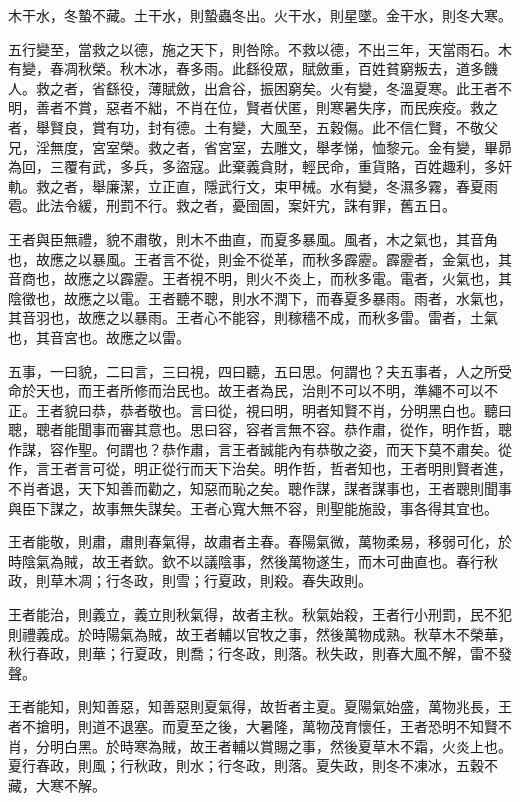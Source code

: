 木干水，冬蟄不藏。土干水，則蟄蟲冬出。火干水，則星墜。金干水，則冬大寒。

五行變至，當救之以德，施之天下，則咎除。不救以德，不出三年，天當雨石。木有變，春凋秋榮。秋木冰，春多雨。此繇役眾，賦斂重，百姓貧窮叛去，道多饑人。救之者，省繇役，薄賦斂，出倉谷，振困窮矣。火有變，冬溫夏寒。此王者不明，善者不賞，惡者不絀，不肖在位，賢者伏匿，則寒暑失序，而民疾疫。救之者，舉賢良，賞有功，封有德。土有變，大風至，五穀傷。此不信仁賢，不敬父兄，淫無度，宮室榮。救之者，省宮室，去雕文，舉孝悌，恤黎元。金有變，畢昴為回，三覆有武，多兵，多盜寇。此棄義貪財，輕民命，重貨賂，百姓趣利，多奸軌。救之者，舉廉潔，立正直，隱武行文，束甲械。水有變，冬濕多霧，春夏雨雹。此法令緩，刑罰不行。救之者，憂囹圄，案奸宄，誅有罪，舊五日。


王者與臣無禮，貌不肅敬，則木不曲直，而夏多暴風。風者，木之氣也，其音角也，故應之以暴風。王者言不從，則金不從革，而秋多霹靂。霹靂者，金氣也，其音商也，故應之以霹靂。王者視不明，則火不炎上，而秋多電。電者，火氣也，其陰徵也，故應之以電。王者聽不聰，則水不潤下，而春夏多暴雨。雨者，水氣也，其音羽也，故應之以暴雨。王者心不能容，則稼穡不成，而秋多雷。雷者，土氣也，其音宮也。故應之以雷。


五事，一曰貌，二曰言，三曰視，四曰聽，五曰思。何謂也？夫五事者，人之所受命於天也，而王者所修而治民也。故王者為民，治則不可以不明，準繩不可以不正。王者貌曰恭，恭者敬也。言曰從，視曰明，明者知賢不肖，分明黑白也。聽曰聰，聰者能聞事而審其意也。思曰容，容者言無不容。恭作肅，從作，明作哲，聰作謀，容作聖。何謂也？恭作肅，言王者誠能內有恭敬之姿，而天下莫不肅矣。從作，言王者言可從，明正從行而天下治矣。明作哲，哲者知也，王者明則賢者進，不肖者退，天下知善而勸之，知惡而恥之矣。聰作謀，謀者謀事也，王者聰則聞事與臣下謀之，故事無失謀矣。王者心寬大無不容，則聖能施設，事各得其宜也。


王者能敬，則肅，肅則春氣得，故肅者主春。春陽氣微，萬物柔易，移弱可化，於時陰氣為賊，故王者欽。欽不以議陰事，然後萬物遂生，而木可曲直也。春行秋政，則草木凋；行冬政，則雪；行夏政，則殺。春失政則。


王者能治，則義立，義立則秋氣得，故者主秋。秋氣始殺，王者行小刑罰，民不犯則禮義成。於時陽氣為賊，故王者輔以官牧之事，然後萬物成熟。秋草木不榮華，秋行春政，則華；行夏政，則喬；行冬政，則落。秋失政，則春大風不解，雷不發聲。


王者能知，則知善惡，知善惡則夏氣得，故哲者主夏。夏陽氣始盛，萬物兆長，王者不搶明，則道不退塞。而夏至之後，大暑隆，萬物茂育懷任，王者恐明不知賢不肖，分明白黑。於時寒為賊，故王者輔以賞賜之事，然後夏草木不霜，火炎上也。夏行春政，則風；行秋政，則水；行冬政，則落。夏失政，則冬不凍冰，五穀不藏，大寒不解。


